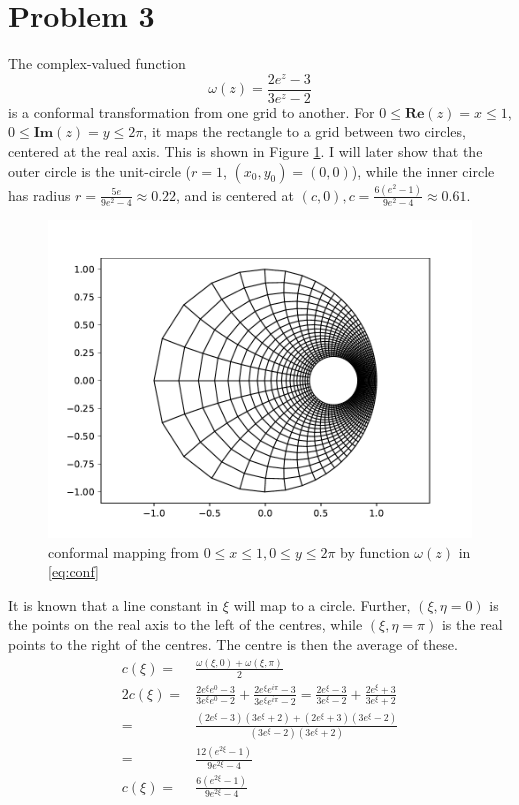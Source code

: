 \documentclass[aps, 12pt]{revtex4}
\begin{document}
\section*{Problem 3}
The complex-valued function
\begin{equation}\label{eq:conf}
    \omega(z) = \frac{2e^z-3}{3e^z-2}
\end{equation}
is a conformal transformation from one grid to another. For $0\leq \mathbf{Re}(z) = x \leq 1$, $0\leq \mathbf{Im}(z)=y\leq 2\pi$, it maps the rectangle to a grid between two circles, centered at the real axis. This is shown in Figure \ref{fig:conformal}. I will later show that the outer circle is the unit-circle ($r=1$, $(x_0, y_0) = (0, 0)$), while the inner circle has radius $r=\frac{5e}{9e^2-4}\approx 0.22$, and is centered at $(c, 0), c=\frac{6(e^2-1)}{9e^2-4}\approx 0.61$.

\begin{figure}
    \includegraphics[width=0.8\linewidth]{conformal.pdf}
    \caption{conformal mapping from $0\leq x\leq 1, 0\leq y\leq 2\pi$ by function $\omega(z)$ in \eqref{eq:conf}}
    \label{fig:conformal}
\end{figure}

It is known that a line constant in $\xi$ will map to a circle. Further, $(\xi, \eta=0)$ is the points on the real axis to the left of the centres, while $(\xi, \eta=\pi)$ is the real points to the right of the centres. The centre is then the average of these.
\begin{align*}
    c(\xi) =  & \frac{\omega(\xi, 0) + \omega(\xi, \pi)}{2}
    \\
    2c(\xi) = & \frac{2e^{\xi}e^0-3}{3e^{\xi}e^0 - 2} + \frac{2e^{\xi}e^{i\pi} - 3}{3e^{\xi}e^{i\pi} -2} = \frac{2e^{\xi}-3}{3e^{\xi} - 2} + \frac{2e^{\xi}+ 3}{3e^{\xi}+2}
    \\
    =         & \frac{(2e^{\xi}-3)(3e^{\xi}+2) + (2e^{\xi}+3)(3e^{\xi}-2)}{(3e^{\xi}-2)(3e^{\xi}+2)}
    \\
    =         & \frac{12(e^{2\xi}-1)}{9e^{2\xi}-4}
    \\
    c(\xi) =  & \frac{6(e^{2\xi}-1)}{9e^{2\xi}-4}
\end{align*}
\end{document}
